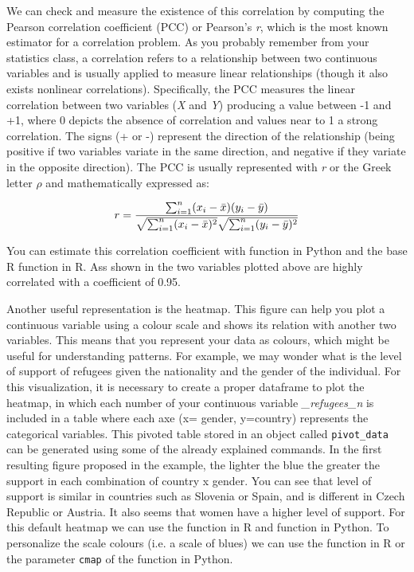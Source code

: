 We can check and measure the existence of this correlation by computing the Pearson correlation coefficient (PCC) or Pearson's \emph{r}, which is the most known estimator for a correlation problem. As you probably remember from your statistics class, a correlation refers to a relationship between two continuous variables and is usually applied to measure linear relationships (though it also exists nonlinear correlations). Specifically, the PCC measures the linear correlation between two variables (\emph{X} and \emph{Y}) producing a value between -1 and +1, where 0 depicts the absence of correlation and values near to 1 a strong correlation. The signs (+ or -) represent the direction of the relationship (being positive if two variables variate in the same direction, and negative if they variate in the opposite direction). The PCC is usually represented with \emph{r} or the Greek letter $\rho$ and mathematically expressed as:

$$
  r =
  \frac{ \sum_{i=1}^{n}(x_i-\bar{x})(y_i-\bar{y}) }{%
        \sqrt{\sum_{i=1}^{n}(x_i-\bar{x})^2}\sqrt{\sum_{i=1}^{n}(y_i-\bar{y})^2}}
$$

You can estimate this correlation coefficient with  function  in Python and the base R function  in R. Ass shown in  the two variables plotted above are highly correlated with a coefficient of 0.95.


Another useful representation is the heatmap. This figure can help you plot a continuous variable using a colour scale and shows its relation with another two variables.  This means that you represent your data as colours, which might be useful for understanding patterns. For example, we may wonder what is the level of support of refugees given the nationality and the gender of the individual. For this visualization, it is necessary to create a proper dataframe to plot the heatmap, in which each number of your continuous variable \emph{\_refugees\_n} is included in a table where each axe (x= gender, y=country) represents the categorical variables. This pivoted table stored in an object called \texttt{pivot\_data} can be generated using some of the already explained commands.  In the first resulting figure proposed in the example, the lighter the blue the greater the support in each combination of country x gender. You can see that level of support is similar in countries such as Slovenia or Spain, and is different in Czech Republic or Austria. It also seems that women have a higher level of support. For this default heatmap we can use the  function  in R and  function  in Python.  To personalize the scale colours (i.e. a scale of blues) we can use the  function  in R or the parameter \texttt{cmap} of the  function  in Python. 

